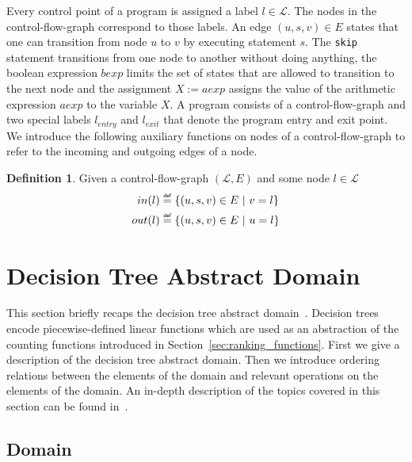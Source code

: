 \documentclass[11pt,a4paper,titlepage]{article}
\theoremstyle{definition}
\newtheorem{definition}{Definition}[section]
\newcommand\eqdef{\mathrel{\overset{\makebox[0pt]{\mbox{\normalfont\tiny\sffamily def}}}{=}}}
\begin{document}
Every control point of a program is assigned a label $l \in \mathcal{L}$. 
The nodes in the control-flow-graph correspond to those labels. 
An edge $(u, s, v) \in E$ states that one can transition from node
$u$ to $v$ by executing statement $s$. 
The \texttt{skip} statement transitions from one node to another without doing anything, 
the boolean expression $bexp$ limits the set of states
that are allowed to transition to the next node and the assignment $X := aexp$ assigns the value of the arithmetic expression $aexp$
to the variable $X$. A program consists of a control-flow-graph and two special labels 
$l_{entry}$ and $l_{exit}$ that denote the program entry and exit point.\\

We introduce the following auxiliary functions on nodes of a control-flow-graph to 
refer to the incoming and outgoing edges of a node.

\begin{definition}\label{def:cfg_in}
    Given a control-flow-graph $(\mathcal{L}, E)$ and some node $l \in \mathcal{L}$
    \begin{align*}
        in(l) &\eqdef \{(u, s, v) \in E \ | \ v = l \}\\
        out(l) &\eqdef \{(u, s, v) \in E \ | \ u = l \}\\
    \end{align*}
\end{definition}


\section{Decision Tree Abstract Domain}\label{sec:decision_tree_abstract_domain}

This section briefly recaps the decision tree abstract domain~\cite{UrbanPhd}. 
Decision trees encode piecewise-defined linear functions which are used as an abstraction 
of the counting functions introduced in Section~\ref{sec:ranking_functions}. 
First we give a description of the decision tree abstract domain. 
Then we introduce ordering relations between the elements of the domain and relevant operations on the elements of the domain. 
An in-depth description of the topics covered in this section can be found in~\cite{UrbanPhd}.\\

\subsection{Domain}
\end{document}
